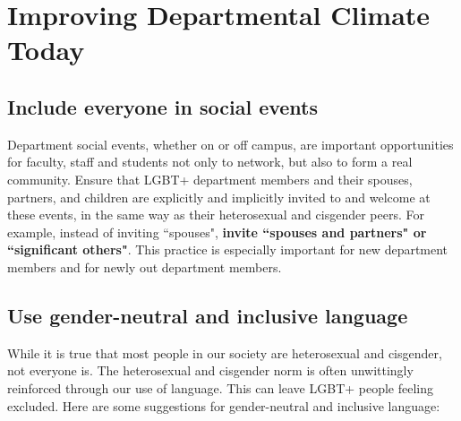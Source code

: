%

\chapter{Improving Departmental Climate Today}	%
\label{climate-today}		%
\normalsize			%



\section {Include everyone in social events}
\label{social-events}
Department social events, whether on or off campus, are important opportunities for faculty, staff and students not only to network, but also to form a real community. Ensure that LGBT+ department members and their spouses, partners, and children are explicitly and implicitly invited to and welcome at these events, in the same way as their heterosexual and cisgender peers. For example, instead of inviting ``spouses", \textbf{invite ``spouses and partners" or ``significant others"}. This practice is especially important for new department members and for newly out department members. 

\section {Use gender-neutral and inclusive language}
\label{gender-language}
While it is true that most people in our society are heterosexual and cisgender, not everyone is. The heterosexual and cisgender norm is often unwittingly reinforced through our use of language. This can leave LGBT+ people feeling excluded. Here are some suggestions for gender-neutral and inclusive language:

